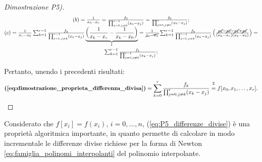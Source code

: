 \begin{property}
\begin{itemize}
\begin{proof}[Dimostrazione P5)]
\begin{equation*}
\begin{matrix}
					(b) = \frac{1}{x_0-x_r}=\frac{f_0}{\prod_{j=0,j\neq 0}^{r-1}(x_0-x_j)}=\frac{f_0}{\prod_{j=0,j\neq 0}^r(x_0-x_j)};\\
					(c) = \frac{1}{x_r-x_0}\sum_{k=1}^{r-1}\frac{f_k}{\prod_{j=1,j\neq k}^{r-1}(x_k-x_j)}\underbrace{\left(\frac{1}{x_k-x_r}-\frac{1}{x_k-x_0}\right)}_{\footnotemark}=
					\frac{1}{\cancel{x_r-x_0}}\sum_{k=1}^{r-1}\frac{f_k}{\prod_{j=1,j\neq k}^{r-1}(x_k-x_j)}\left(\frac{\cancel{x_k}-\cancel{x_0}-\cancel{x_k}+\cancel{x_r}}{(x_k-x_r)(x_k-x_0)}\right)=\\
					\sum_{k=1}^{r-1}\frac{f_k}{\prod_{j=0,j\neq k}^{r-1}(x_k-x_j)};
				\end{matrix}
			\end{equation*}
			\addtocounter{footnote}{-1}
			
			Pertanto, unendo i precedenti risultati:
			\begin{equation*}
				\textbf{(\ref{eq:dimostrazione_proprieta_differenza_divisa})}=\sum_{k=0}^r\frac{f_k}{\prod_{j=0,j\neq k}^r (x_k-x_j)}\overset{\footnotemark}{=} f[x_0,x_1,\hdots,x_r].
			\end{equation*}
		\end{proof}
	\end{itemize}
\end{property}

\begin{remark}[Importante]
	Considerato che $f[x_i]=f(x_i),\, i=0, \hdots, n$, (\ref{eq:P5_differenze_divise}) è  una proprietà algoritmica importante, in quanto permette di calcolare in modo incrementale le differenze divise richiese per la forma di Newton \ref{eq:famiglia_polinomi_interpolanti} del polinomio interpolante.
\end{remark}

